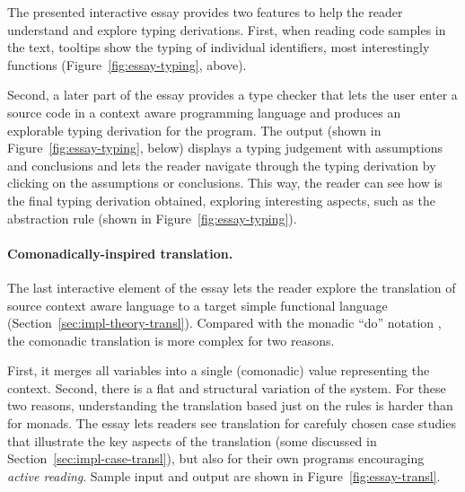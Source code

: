 The presented interactive essay provides two features to help the reader understand and explore
typing derivations. First, when reading code samples in the text, tooltips show the typing of
individual identifiers, most interestingly functions (Figure~\ref{fig:essay-typing}, above).

Second, a later part of the essay provides a type checker that lets the user enter a source code
in a context aware programming language and produces an explorable typing derivation for the
program. The output (shown in Figure~\ref{fig:essay-typing}, below) displays a typing judgement
with assumptions and conclusions and lets the reader navigate through the typing derivation by
clicking on the assumptions or conclusions. This way, the reader can see how is the final typing
derivation obtained, exploring interesting aspects, such as the abstraction rule (shown in
Figure~\ref{fig:essay-typing}).

\paragraph{Comonadically-inspired translation.}

The last interactive element of the essay lets the reader explore the translation of source
context aware language to a target simple functional language (Section~\ref{sec:impl-theory-transl}).
Compared with the monadic ``do'' notation \cite{other-haskell98}, the comonadic translation is more
complex for two reasons.

First, it merges all variables into a single (comonadic) value representing
the context. Second, there is a flat and structural variation of the system. For these two reasons,
understanding the translation based just on the rules is harder than for monads. The essay lets
readers see translation for carefuly chosen case studies that illustrate the key aspects of the
translation (some discussed in Section~\ref{sec:impl-case-transl}), but also for their own
programs encouraging \emph{active reading}. Sample input and output are shown in
Figure~\ref{fig:essay-transl}.



